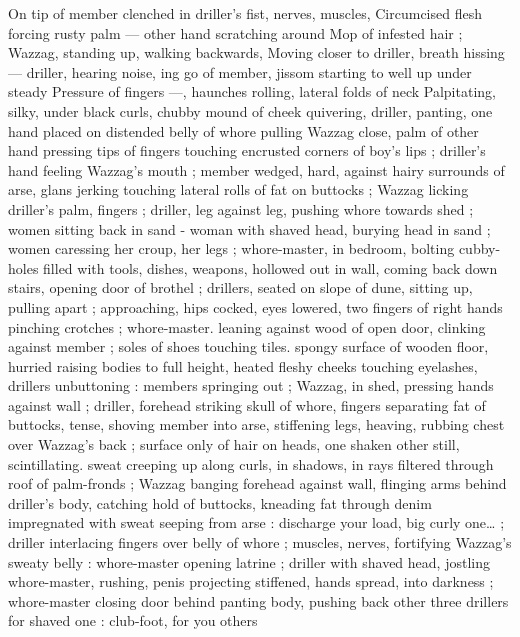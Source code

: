 On tip of member clenched in driller's fist, nerves, muscles, 
Circumcised flesh forcing rusty palm --- other hand scratching around 
Mop of infested hair ; Wazzag, standing up, walking backwards, 
Moving closer to driller, breath hissing --- driller, hearing noise, 
ing go of member, jissom starting to well up under steady 
Pressure of fingers ---, haunches rolling, lateral folds of neck 
Palpitating, silky, under black curls, chubby mound of cheek 
quivering, driller, panting, one hand placed on distended belly of 
whore pulling Wazzag close, palm of other hand pressing tips of 
fingers touching encrusted corners of boy's lips ; driller's hand 
feeling Wazzag's mouth ; member wedged, hard, against hairy 
surrounds of arse, glans jerking touching lateral rolls of fat on 
buttocks ; Wazzag licking driller's palm, fingers ; driller, leg against 
leg, pushing whore towards shed ; women sitting back in sand - 
woman with shaved head, burying head in sand ; women caressing 
her croup, her legs ; whore-master, in bedroom, bolting cubby-holes 
filled with tools, dishes, weapons, hollowed out in wall, coming back 
down stairs, opening door of brothel ; drillers, seated on slope of 
dune, sitting up, pulling apart ; approaching, hips cocked, eyes 
lowered, two fingers of right hands pinching crotches ; whore-master. 
leaning against wood of open door, clinking against member ; soles 
of shoes touching tiles. spongy surface of wooden floor, hurried 
raising bodies to full height, heated fleshy cheeks touching 
eyelashes, drillers unbuttoning : members springing out ; Wazzag, in 
shed, pressing hands against wall ; driller, forehead striking skull of 
whore, fingers separating fat of buttocks, tense, shoving member 
into arse, stiffening legs, heaving, rubbing chest over Wazzag's back 
; surface only of hair on heads, one shaken other still, scintillating. 
sweat creeping up along curls, in shadows, in rays filtered through 
roof of palm-fronds ; Wazzag banging forehead against wall, flinging 
arms behind driller's body, catching hold of buttocks, kneading fat 
through denim impregnated with sweat seeping from arse :{\td} {\gl}{\td} 
discharge your load, big curly one{\ldots}{\gr} ; driller interlacing fingers over 
belly of whore ; muscles, nerves, fortifying Wazzag's sweaty belly : 
whore-master opening latrine ; driller with shaved head, jostling 
whore-master, rushing, penis projecting stiffened, hands spread, into 
darkness ; whore-master closing door behind panting body, pushing 
back other three drillers{\td} {\gl} for shaved one : club-foot, for you others 
